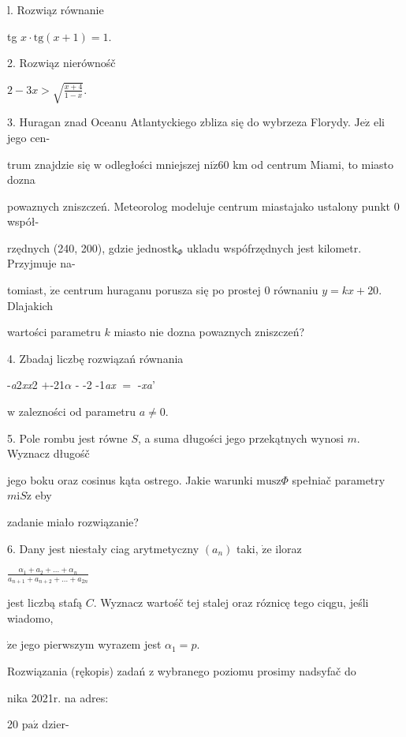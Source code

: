 \documentclass[a4paper,12pt]{article}
\begin{document}
l. Rozwiąz równanie

tg $x\cdot \mathrm{t}\mathrm{g}(x+1)=1.$

2. Rozwiąz nierównośč

$2-3x>\sqrt{\frac{x+4}{1-x}}.$

3. Huragan znad Oceanu Atlantyckiego zbliza się do wybrzeza Florydy. $\mathrm{J}\mathrm{e}\dot{\mathrm{z}}$ eli jego cen-

trum znajdzie się $\mathrm{w}$ odległości mniejszej $\mathrm{n}\mathrm{i}\dot{\mathrm{z}}60$ km od centrum Miami, to miasto dozna

powaznych zniszczeń. Meteorolog modeluje centrum miastajako ustalony punkt $0$ współ-

rzędnych (240, 200), gdzie $\mathrm{j}\mathrm{e}\mathrm{d}\mathrm{n}\mathrm{o}\mathrm{s}\mathrm{t}\mathrm{k}_{\Phi}$ ukladu wspófrzędnych jest kilometr. Przyjmuje na-

tomiast, $\dot{\mathrm{z}}\mathrm{e}$ centrum huraganu porusza się po prostej $0$ równaniu $y=kx+20$. Dlajakich

wartości parametru $k$ miasto nie dozna powaznych zniszczeń?

4. Zbadaj liczbę rozwiązań równania

-{\it a}2{\it xx}2 $+$-21$\alpha$ - -2 -1{\it ax} $=$ -{\it xa}'

$\mathrm{w}$ zalezności od parametru $a\neq 0.$

5. Pole rombu jest równe $S$, a suma długości jego przekątnych wynosi $m$. Wyznacz długośč

jego boku oraz cosinus kąta ostrego. Jakie warunki $\mathrm{m}\mathrm{u}\mathrm{s}\mathrm{z}\Phi$ spełniač parametry $m\mathrm{i}S\dot{\mathrm{z}}$ eby

zadanie miało rozwiązanie?

6. Dany jest niestały ciag arytmetyczny $(a_{n})$ taki, $\dot{\mathrm{z}}\mathrm{e}$ iloraz

$\displaystyle \frac{\alpha_{1}+a_{2}+\ldots+\alpha_{n}}{a_{n+1}+a_{n+2}+\ldots+a_{2n}}$

jest liczbą stafą $C$. Wyznacz wartośč tej stalej oraz róznicę tego ciqgu, jeśli wiadomo,

$\dot{\mathrm{z}}\mathrm{e}$ jego pierwszym wyrazem jest $\alpha_{1}=p.$

Rozwiązania (rękopis) zadań z wybranego poziomu prosimy nadsyfač do

nika 2021r. na adres:

20 $\mathrm{p}\mathrm{a}\acute{\mathrm{z}}$ dzier-
\end{document}

